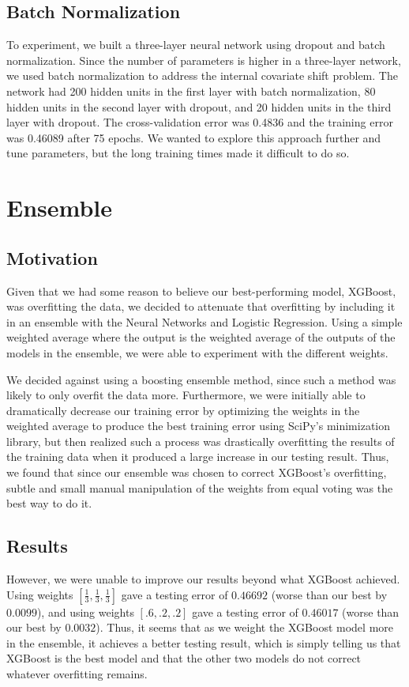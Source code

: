 \documentclass[twoside,11pt]{article}
\theoremstyle{definition}
\begin{document}
\subsection{Batch Normalization}
To experiment, we built a three-layer neural network using dropout and batch normalization. Since the number of parameters is higher in a three-layer network, we used batch normalization to address the internal covariate shift problem. \cite{Batch_normalization} The network had 200 hidden units in the first layer with batch normalization, 80 hidden units in the second layer with dropout, and 20 hidden units in the third layer with dropout. The cross-validation error was 0.4836 and the training error was 0.46089 after 75 epochs. We wanted to explore this approach further and tune parameters, but the long training times made it difficult to do so.

\section{Ensemble}
  \subsection{Motivation}
  Given that we had some reason to believe our best-performing model, XGBoost, was overfitting the data, we decided to attenuate that overfitting by including it in an ensemble with the Neural Networks and Logistic Regression. Using a simple weighted average where the output is the weighted average of the outputs of the models in the ensemble, we were able to experiment with the different weights.

  We decided against using a boosting ensemble method, since such a method was likely to only overfit the data more. Furthermore, we were initially able to dramatically decrease our training error by optimizing the weights in the weighted average to produce the best training error using SciPy's minimization library, but then realized such a process was drastically overfitting the results of the training data when it produced a large increase in our testing result. Thus, we found that since our ensemble was chosen to correct XGBoost's overfitting, subtle and small manual manipulation of the weights from equal voting was the best way to do it.

  \subsection{Results}
  However, we were unable to improve our results beyond what XGBoost achieved. Using weights $[\frac{1}{3}, \frac{1}{3}, \frac{1}{3}]$ gave a testing error of $0.46692$ (worse than our best by $0.0099$), and using weights $[.6, .2, .2]$ gave a testing error of $0.46017$ (worse than our best by $0.0032$). Thus, it seems that as we weight the XGBoost model more in the ensemble, it achieves a better testing result, which is simply telling us that XGBoost is the best model and that the other two models do not correct whatever overfitting remains.
\end{document}

